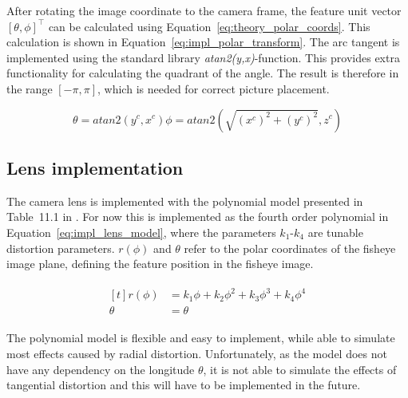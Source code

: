 After rotating the image coordinate to the camera frame, the feature unit vector $[\theta, \phi]^\top$ can be calculated using Equation~\eqref{eq:theory_polar_coords}. This calculation is shown in Equation~\eqref{eq:impl_polar_transform}. The arc tangent is implemented using the standard library \emph{atan2(y,x)}-function. This provides extra functionality for calculating the quadrant of the angle. The result is therefore in the range $[-\pi,\pi]$, which is needed for correct picture placement.

\begin{subequations}
    \begin{equation}
        \theta = atan2\left(y^c,x^c\right)
        \label{eq:impl_polar_transform_theta}
    \end{equation}
    \begin{equation}
        \phi = atan2\left(\sqrt{(x^c)^2 + (y^c)^2},z^c\right)
        \label{eq:impl_polar_transform_phi}
    \end{equation}
    \label{eq:impl_polar_transform}
\end{subequations}

\subsection{Lens implementation} \label{sec:lens_modeling}

The camera lens is implemented with the polynomial model presented in Table~11.1 in \cite{FisheyeCorke}. For now this is implemented as the fourth order polynomial in Equation~\eqref{eq:impl_lens_model}, where the parameters $k_1$-$k_4$ are tunable distortion parameters. $r(\phi)$ and $\theta$ refer to the polar coordinates of the fisheye image plane, defining the feature position in the fisheye image.

\begin{align}
    \begin{aligned}[t]
    r(\phi) &= k_1 \phi + k_2 \phi^2 + k_3 \phi^3 + k_4 \phi^4 \\[0.75ex]
    \theta &= \theta
    \end{aligned}
    \label{eq:impl_lens_model}
\end{align}

The polynomial model is flexible and easy to implement, while able to simulate most effects caused by radial distortion. Unfortunately, as the model does not have any dependency on the longitude $\theta$, it is not able to simulate the effects of tangential distortion and this will have to be implemented in the future.

